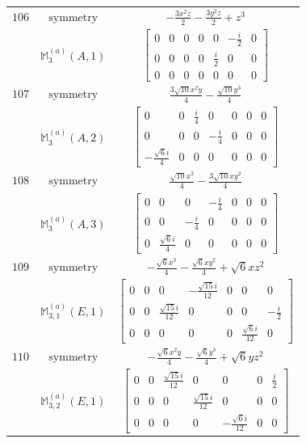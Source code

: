 \documentclass[fleqn,8pt,landscape]{jsarticle}
\begin{document}
\begin{longtable}{ccc}
$ 106 $ & $ \text{symmetry} $ & $ - \frac{3 x^{2} z}{2} - \frac{3 y^{2} z}{2} + z^{3} $ \\
$  $ & $ \mathbb{M}_{3}^{(a)}(A,1) $ & $ \begin{bmatrix} 0 & 0 & 0 & 0 & 0 & - \frac{i}{2} & 0 \\ 0 & 0 & 0 & 0 & \frac{i}{2} & 0 & 0 \\ 0 & 0 & 0 & 0 & 0 & 0 & 0 \end{bmatrix} $ \\ \hline
$ 107 $ & $ \text{symmetry} $ & $ \frac{3 \sqrt{10} x^{2} y}{4} - \frac{\sqrt{10} y^{3}}{4} $ \\
$  $ & $ \mathbb{M}_{3}^{(a)}(A,2) $ & $ \begin{bmatrix} 0 & 0 & \frac{i}{4} & 0 & 0 & 0 & 0 \\ 0 & 0 & 0 & - \frac{i}{4} & 0 & 0 & 0 \\ - \frac{\sqrt{6} i}{4} & 0 & 0 & 0 & 0 & 0 & 0 \end{bmatrix} $ \\ \hline
$ 108 $ & $ \text{symmetry} $ & $ \frac{\sqrt{10} x^{3}}{4} - \frac{3 \sqrt{10} x y^{2}}{4} $ \\
$  $ & $ \mathbb{M}_{3}^{(a)}(A,3) $ & $ \begin{bmatrix} 0 & 0 & 0 & - \frac{i}{4} & 0 & 0 & 0 \\ 0 & 0 & - \frac{i}{4} & 0 & 0 & 0 & 0 \\ 0 & \frac{\sqrt{6} i}{4} & 0 & 0 & 0 & 0 & 0 \end{bmatrix} $ \\ \hline
$ 109 $ & $ \text{symmetry} $ & $ - \frac{\sqrt{6} x^{3}}{4} - \frac{\sqrt{6} x y^{2}}{4} + \sqrt{6} x z^{2} $ \\
$  $ & $ \mathbb{M}_{3,1}^{(a)}(E,1) $ & $ \begin{bmatrix} 0 & 0 & 0 & - \frac{\sqrt{15} i}{12} & 0 & 0 & 0 \\ 0 & 0 & \frac{\sqrt{15} i}{12} & 0 & 0 & 0 & - \frac{i}{2} \\ 0 & 0 & 0 & 0 & 0 & \frac{\sqrt{6} i}{12} & 0 \end{bmatrix} $ \\ \hline
$ 110 $ & $ \text{symmetry} $ & $ - \frac{\sqrt{6} x^{2} y}{4} - \frac{\sqrt{6} y^{3}}{4} + \sqrt{6} y z^{2} $ \\
$  $ & $ \mathbb{M}_{3,2}^{(a)}(E,1) $ & $ \begin{bmatrix} 0 & 0 & \frac{\sqrt{15} i}{12} & 0 & 0 & 0 & \frac{i}{2} \\ 0 & 0 & 0 & \frac{\sqrt{15} i}{12} & 0 & 0 & 0 \\ 0 & 0 & 0 & 0 & - \frac{\sqrt{6} i}{12} & 0 & 0 \end{bmatrix} $ \\ \hline

\end{longtable}
\end{document}
